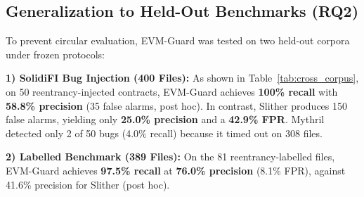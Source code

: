 \documentclass[conference]{IEEEtran}
\begin{document}
\subsection{Generalization to Held-Out Benchmarks (RQ2)}
To prevent circular evaluation, EVM-Guard was tested on two held-out corpora under frozen protocols:

\smallskip
\noindent\textbf{1) SolidiFI Bug Injection (400 Files):} As shown in Table~\ref{tab:cross_corpus}, on 50 reentrancy-injected contracts, EVM-Guard achieves \textbf{100\% recall} with \textbf{58.8\% precision} (35 false alarms, post hoc). In contrast, Slither produces 150 false alarms, yielding only \textbf{25.0\% precision} and a \textbf{42.9\% FPR}. Mythril detected only 2 of 50 bugs (4.0\% recall) because it timed out on 308 files.

\smallskip
\noindent\textbf{2) Labelled Benchmark (389 Files):} On the 81 reentrancy-labelled files, EVM-Guard achieves \textbf{97.5\% recall} at \textbf{76.0\% precision} (8.1\% FPR), against 41.6\% precision for Slither (post hoc).

\begin{table}[h]
\centering
\small
\renewcommand{\arraystretch}{1.12}
\caption{Cross-Corpus Reentrancy Performance Across the Three Real Benchmarks. All evaluations on these corpora are reported post hoc.}
\label{tab:cross_corpus}
\end{table}
\end{document}

